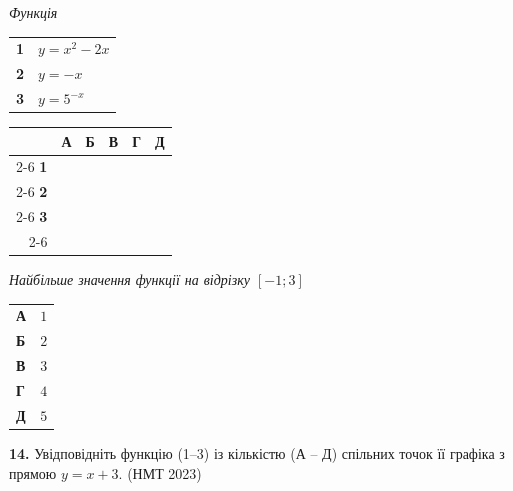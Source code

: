 \documentclass[14pt]{extarticle}
\newcommand{\nmtyear}[1]{\hfill{\small\color{yearcolor}(НМТ #1)}}
\begin{document}
\vspace{0.3cm}

\noindent
\begin{minipage}[t]{0.45\textwidth}
    \textit{Функція} \par \vspace{0.2cm}
    \begin{tabular}{@{}p{0.5cm} p{5cm}@{}}
    \textbf{1} & $y=x^2-2x$ \\[0.3cm]
    \textbf{2} & $y=-x$ \\[0.3cm]
    \textbf{3} & $y=5^{-x}$ \\
    \end{tabular}
    
    \vspace{0.5cm}
    
    \begingroup
    \setlength{\tabcolsep}{4pt}
    \renewcommand{\arraystretch}{1.2}
    \small
    \begin{tabular}{r|c|c|c|c|c|}
         \multicolumn{1}{c}{} & \multicolumn{1}{c}{\textbf{А}} & \multicolumn{1}{c}{\textbf{Б}} & \multicolumn{1}{c}{\textbf{В}} & \multicolumn{1}{c}{\textbf{Г}} & \multicolumn{1}{c}{\textbf{Д}} \\ \cline{2-6}
         \textbf{1} & & & & & \\ \cline{2-6}
         \textbf{2} & & & & & \\ \cline{2-6}
         \textbf{3} & & & & & \\ \cline{2-6}
    \end{tabular}
    \endgroup
\end{minipage}%
\hfill
\begin{minipage}[t]{0.50\textwidth}
    \textit{Найбільше значення функції на відрізку $[-1; 3]$} \par \vspace{0.2cm}
    \begin{tabular}{@{}p{0.5cm} p{7.5cm}@{}}
    \textbf{А} & $1$ \\[0.3cm]
    \textbf{Б} & $2$ \\[0.3cm]
    \textbf{В} & $3$ \\[0.3cm]
    \textbf{Г} & $4$ \\[0.3cm]
    \textbf{Д} & $5$ \\
    \end{tabular}
\end{minipage}

\vspace{0.7cm}

\noindent\textbf{14.} Увідповідніть функцію (1–3) із кількістю (А – Д) спільних точок її графіка з прямою $y=x+3$. \nmtyear{2023}
\end{document}
